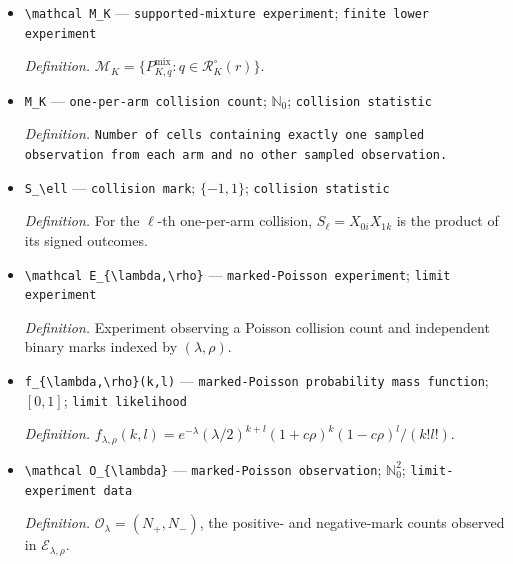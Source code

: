 \documentclass{article}
\begin{document}
\begin{itemize}
  \par\smallskip\noindent\emph{Definition.} Mixture of finite-array observation laws under \(\Pi_{K,q}^{\mathrm{shell}}\).
  \item \texttt{\textbackslash{}\allowbreak{}mathcal M\_\allowbreak{}K} --- \texttt{supported-\allowbreak{}mixture experiment}; \texttt{finite lower experiment}
  \par\smallskip\noindent\emph{Definition.} \(\mathcal M_K=\{P^{\mathrm{mix}}_{K,q}:q\in\mathcal R_K^{\circ}(r)\}\).
  \item \texttt{M\_\allowbreak{}K} --- \texttt{one-\allowbreak{}per-\allowbreak{}arm collision count}; \(\mathbb N_0\); \texttt{collision statistic}
  \par\smallskip\noindent\emph{Definition.} \texttt{Number of cells containing exactly one sampled observation from each arm and no other sampled observation.}
  \item \texttt{S\_\allowbreak{}\textbackslash{}\allowbreak{}ell} --- \texttt{collision mark}; \(\{-1,1\}\); \texttt{collision statistic}
  \par\smallskip\noindent\emph{Definition.} For the \(\ell\)-th one-per-arm collision, \(S_\ell=X_{0i}X_{1k}\) is the product of its signed outcomes.
  \item \texttt{\textbackslash{}\allowbreak{}mathcal E\_\allowbreak{}\{\textbackslash{}\allowbreak{}lambda,\allowbreak{}\textbackslash{}\allowbreak{}rho\}\allowbreak{}} --- \texttt{marked-\allowbreak{}Poisson experiment}; \texttt{limit experiment}
  \par\smallskip\noindent\emph{Definition.} Experiment observing a Poisson collision count and independent binary marks indexed by \((\lambda,\rho)\).
  \item \texttt{f\_\allowbreak{}\{\textbackslash{}\allowbreak{}lambda,\allowbreak{}\textbackslash{}\allowbreak{}rho\}\allowbreak{}(k,\allowbreak{}l)} --- \texttt{marked-\allowbreak{}Poisson probability mass function}; \([0,1]\); \texttt{limit likelihood}
  \par\smallskip\noindent\emph{Definition.} \(f_{\lambda,\rho}(k,l)=e^{-\lambda}(\lambda/2)^{k+l}(1+c\rho)^k(1-c\rho)^l/(k!l!)\).
  \item \texttt{\textbackslash{}\allowbreak{}mathcal O\_\allowbreak{}\{\textbackslash{}\allowbreak{}lambda\}\allowbreak{}} --- \texttt{marked-\allowbreak{}Poisson observation}; \(\mathbb N_0^2\); \texttt{limit-\allowbreak{}experiment data}
  \par\smallskip\noindent\emph{Definition.} \(\mathcal O_{\lambda}=(N_+,N_-)\), the positive- and negative-mark counts observed in \(\mathcal E_{\lambda,\rho}\).

\end{itemize}
\end{document}
